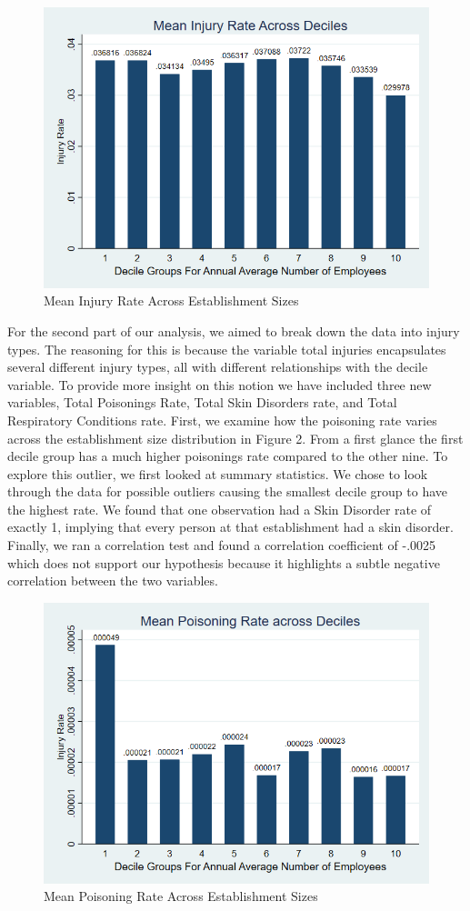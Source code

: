 \documentclass[12pt]{article}
\begin{document}
\begin{figure}
    \centering
    \includegraphics[width=0.7\linewidth]{Inj_RateDecileBar (5).png}
    \caption{Mean Injury Rate Across Establishment Sizes}
    \label{fig:enter-label}
\end{figure}
For the second part of our analysis, we aimed to break down the data into injury types. The reasoning for this is because the variable total injuries encapsulates several different injury types, all with different relationships with the decile variable. To provide more insight on this notion we have included three new variables, Total Poisonings Rate, Total Skin Disorders rate, and Total Respiratory Conditions rate. First, we examine how the poisoning rate varies across the establishment size distribution in Figure 2. From a first glance the first decile group has a much higher poisonings rate compared to the other nine. To explore this outlier, we first looked at summary statistics. We chose to look through the data for possible outliers causing the smallest decile group to have the highest rate. We found that one observation had a Skin Disorder rate of exactly 1, implying that every person at that establishment had a skin disorder. Finally, we ran a correlation test and found a correlation coefficient of -.0025 which does not support our hypothesis because it highlights a subtle negative correlation between the two variables.


\begin{figure}
    \centering
    \includegraphics[width=0.7\linewidth]{PoisoningsDecileBar (3).png}
    \caption{Mean Poisoning Rate Across Establishment Sizes}
    \label{fig:enter-label}
\end{figure}
\end{document}
